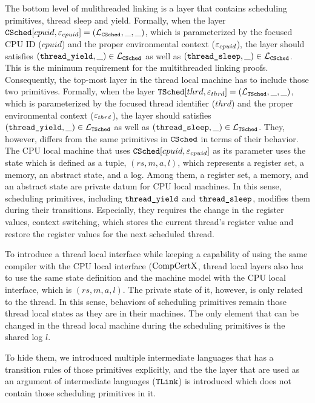 The bottom level of mulithreaded linking is 
a layer that contains scheduling primitives, thread sleep and yield.
Formally, 
when the layer ${{\mathrm{\texttt{CSched}}}}[cpuid, {\varepsilon}_{cpuid}] = (\mathcal{L}_{{{\mathrm{\texttt{CSched}}}}}, \_, \_)$, which is parameterized by the focused CPU ID ($cpuid$) and the proper environmental context (${\varepsilon}_{cpuid}$), 
the layer should satisfies 
$({\mathrm{\texttt{thread\_yield}}}, \_) \in \mathcal{L}_{{{\mathrm{\texttt{CSched}}}}}$ as well as 
$({\mathrm{\texttt{thread\_sleep}}}, \_) \in \mathcal{L}_{{{\mathrm{\texttt{CSched}}}}}$. 
This is the minimum requirement for the multithreaded linking proofs. 
Consequently, 
the top-most layer in the thread local machine
has to include those two primitives. 
Formally, 
when the layer ${{\mathrm{\texttt{TSched}}}}[thrd, {\varepsilon}_{thrd}] = (\mathcal{L}_{{{\mathrm{\texttt{TSched}}}}}, \_, \_)$, which is parameterized by the focused thread identifier ($thrd$) and the proper environmental context (${\varepsilon}_{thrd}$), 
the layer should satisfies 
$({\mathrm{\texttt{thread\_yield}}}, \_) \in \mathcal{L}_{{{\mathrm{\texttt{TSched}}}}}$ as well as 
$({\mathrm{\texttt{thread\_sleep}}}, \_) \in \mathcal{L}_{{{\mathrm{\texttt{TSched}}}}}$. 
They, however, differs from 
the same primitives 
in  ${{\mathrm{\texttt{CSched}}}}$ in terms of their behavior. 
The CPU local machine that uses ${{\mathrm{\texttt{CSched}}}}[cpuid, {\varepsilon}_{cpuid}]$  as its parameter 
uses the state which is defined as
a tuple, 
$(rs, m, a, l)$,
which represents 
a register set, a memory, an abstract state, and a log.
Among them, a register set, a memory, and an abstract state are private datum for CPU local machines. 
In this sense, scheduling primitives, including ${\mathrm{\texttt{thread\_yield}}}$ and ${\mathrm{\texttt{thread\_sleep}}}$,
modifies them during their transitions. 
Especially, they requires the change in the register values,  context switching,
which stores the current thread's register value 
and restore the register values for the next scheduled thread. 

To introduce a thread local interface while keeping a capability of 
using the same compiler with the CPU local interface ($\mathrm{CompCertX}$, 
thread local layers also has to use the same state definition and the machine model 
with the CPU local interface, which is $(rs, m, a, l)$.
The private state of it, however, 
is only related to the thread. 
In this sense, 
behaviors of scheduling primitives remain those thread local states as they are in their machines. 
The only element that can be changed  in the thread local machine during the scheduling primitives 
is the shared log $l$. 

To hide them, 
we introduced multiple intermediate languages 
that has a transition rules of those primitives explicitly, and the 
the layer that are used as an argument of 
intermediate languages (${{\mathrm{\texttt{TLink}}}}$) is introduced which does not contain those scheduling primitives in it. 

